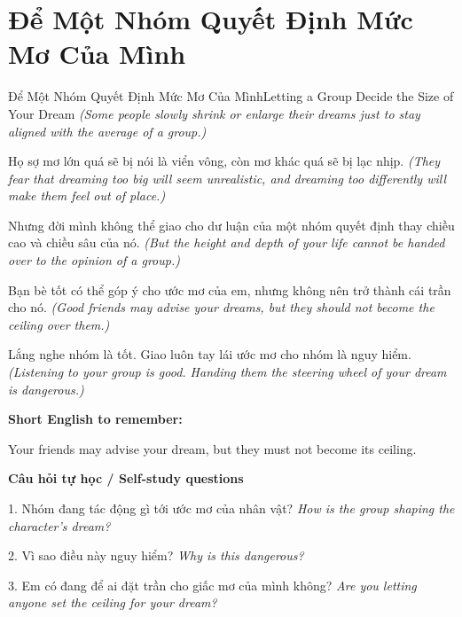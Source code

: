 \section{Để Một Nhóm Quyết Định Mức Mơ Của Mình}
\begin{truyen}{Để Một Nhóm Quyết Định Mức Mơ Của Mình}{Letting a Group Decide the Size of Your Dream}
\textit{(Some people slowly shrink or enlarge their dreams just to stay aligned with the average of a group.)}

Họ sợ mơ lớn quá sẽ bị nói là viển vông, còn mơ khác quá sẽ bị lạc nhịp.
\textit{(They fear that dreaming too big will seem unrealistic, and dreaming too differently will make them feel out of place.)}

Nhưng đời mình không thể giao cho dư luận của một nhóm quyết định thay chiều cao và chiều sâu của nó.
\textit{(But the height and depth of your life cannot be handed over to the opinion of a group.)}

Bạn bè tốt có thể góp ý cho ước mơ của em, nhưng không nên trở thành cái trần cho nó.
\textit{(Good friends may advise your dreams, but they should not become the ceiling over them.)}

\end{truyen}

\begin{baihoc}
Lắng nghe nhóm là tốt. Giao luôn tay lái ước mơ cho nhóm là nguy hiểm.
\textit{(Listening to your group is good. Handing them the steering wheel of your dream is dangerous.)}
\end{baihoc}

\begin{ghinhoanh}
\textbf{Short English to remember:}

Your friends may advise your dream, but they must not become its ceiling.

\end{ghinhoanh}

\begin{tuhocnhanh}
\textbf{Câu hỏi tự học / Self-study questions}

1. Nhóm đang tác động gì tới ước mơ của nhân vật? \textit{How is the group shaping the character's dream?}

2. Vì sao điều này nguy hiểm? \textit{Why is this dangerous?}

3. Em có đang để ai đặt trần cho giấc mơ của mình không? \textit{Are you letting anyone set the ceiling for your dream?}
\end{tuhocnhanh}
\ngancach


